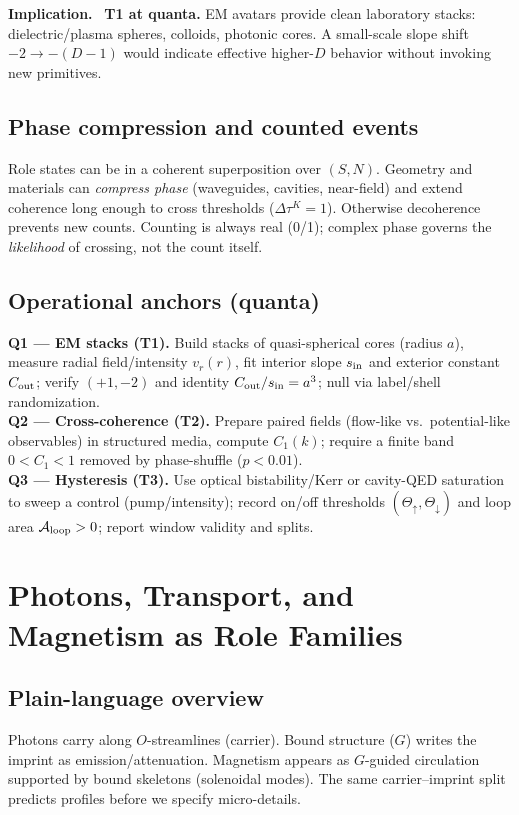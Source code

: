 \documentclass[12pt,a4paper,oneside]{scrreprt}
\newenvironment{implication}{\par\vspace{0.5em}\noindent\textbf{Implication.}\ }{\par\vspace{0.5em}}
\begin{document}
\begin{implication}
\textbf{T1 at quanta.} EM avatars provide clean laboratory stacks: dielectric/plasma spheres, colloids, photonic cores. A small-scale slope shift $-2\to-(D-1)$ would indicate effective higher-$D$ behavior without invoking new primitives.
\end{implication}

\section{Phase compression and counted events}\label{sec:quanta-phase}
Role states can be in a coherent superposition over $(S,N)$. Geometry and materials can \emph{compress phase} (waveguides, cavities, near-field) and extend coherence long enough to cross thresholds ($\Delta\tau^K=1$). Otherwise decoherence prevents new counts. Counting is always real (0/1); complex phase governs the \emph{likelihood} of crossing, not the count itself.

\section{Operational anchors (quanta)}\label{sec:quanta-anchors}
\textbf{Q1 — EM stacks (T1).} Build stacks of quasi-spherical cores (radius $a$), measure radial field/intensity $v_r(r)$, fit interior slope $s_{\rm in}$ and exterior constant $C_{\rm out}$; verify $(+1,-2)$ and identity $C_{\rm out}/s_{\rm in}=a^3$; null via label/shell randomization.\\
\textbf{Q2 — Cross-coherence (T2).} Prepare paired fields (flow-like vs.\ potential-like observables) in structured media, compute $C_1(k)$; require a finite band $0<C_1<1$ removed by phase-shuffle ($p<0.01$).\\
\textbf{Q3 — Hysteresis (T3).} Use optical bistability/Kerr or cavity-QED saturation to sweep a control (pump/intensity); record on/off thresholds $(\Theta_\uparrow,\Theta_\downarrow)$ and loop area $\mathcal A_{\rm loop}>0$; report window validity and splits.

\chapter{Photons, Transport, and Magnetism as Role Families}\label{ch:quanta-families}

\section*{Plain-language overview}
Photons carry along $O$-streamlines (carrier). Bound structure ($G$) writes the imprint as emission/attenuation. Magnetism appears as $G$-guided circulation supported by bound skeletons (solenoidal modes). The same carrier–imprint split predicts profiles before we specify micro-details.
\end{document}
